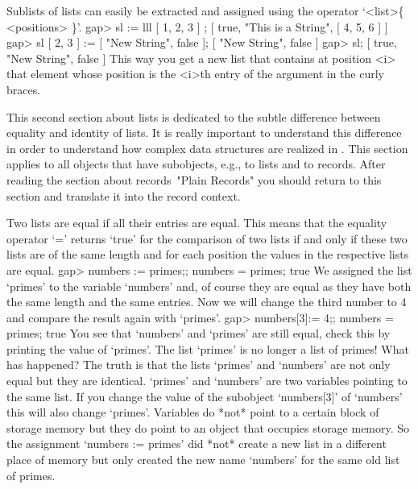 Sublists of lists can easily be extracted and assigned using the operator
`<list>\{ <positions> \}'.
\beginexample
    gap> sl := lll{ [ 1, 2, 3 ] };
    [ true, "This is a String", [ 4, 5, 6 ] ]
    gap> sl{ [ 2, 3 ] } := [ "New String", false ];
    [ "New String", false ]
    gap> sl;
    [ true, "New String", false ] 
\endexample
This way you get  a new list that  contains at position <i> that  element
whose position is the <i>th entry of the argument in the curly braces.

\null

%
This second  section  about lists is dedicated  to  the subtle difference
between  equality  and identity  of   lists. It  is  really  important to
understand   this  difference in  order   to  understand how complex data
structures are  realized in {\GAP}.   This section applies  to all {\GAP}
objects  that have  subobjects,  e.g.,  to lists   and to  records. After
reading the section about records~"Plain Records" you should return to
this section and translate it into the record context.

Two  lists are equal if all their entries are equal.  This means that the
equality operator `=' returns `true' for the  comparison of  two lists if
and  only if these two lists are of the same length and for each position
the values in the respective lists are equal.
\beginexample
    gap> numbers := primes;; numbers = primes;
    true 
\endexample
We assigned  the  list `primes' to the variable  `numbers' and, of course
they are equal as they have  both  the same length  and the same entries.
Now we  will change the  third number to  4 and  compare the result again
with `primes'.
\beginexample
    gap> numbers[3]:= 4;; numbers = primes;
    true 
\endexample
You  see that  `numbers' and  `primes'  are still   equal, check this  by
printing the value of `primes'. The list `primes' is  no longer a list of
primes! What has  happened?  The truth is  that  the  lists  `primes' and
`numbers' are  not  only  equal but  they  are  identical.  `primes'  and
`numbers' are two variables pointing to the  same list. If you change the
value of  the subobject `numbers[3]'  of `numbers' this will  also change
`primes'.  Variables do *not* point to  a certain block of storage memory
but they do  point  to an object that  occupies  storage memory.   So the
assignment `numbers := primes' did *not* create a new list in a different
place of memory but only created the new name `numbers'  for the same old
list of primes.

